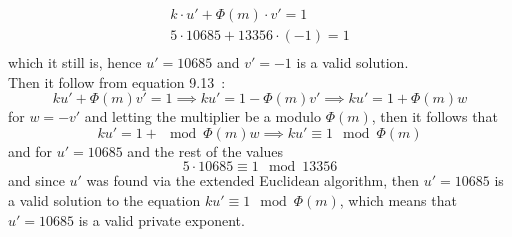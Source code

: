 \documentclass[12pt]{article}
\begin{document}
\begin{align*}
    k \cdot u' + \Phi(m) \cdot v' = 1\\
    5 \cdot 10685 + 13356 \cdot (-1) = 1\\
\end{align*}
which it still is, hence $u' = 10685$ and $v' = -1$ is a valid solution.\\
Then it follow from equation 9.13~\cite{Algebra}:
\begin{equation*}
    ku' + \Phi(m)v' = 1 \implies ku' = 1 - \Phi(m)v' \implies ku' = 1 + \Phi(m)w
\end{equation*}
for $w=-v'$ and letting the multiplier be a modulo $\Phi(m)$, then it follows that
\begin{equation*}
    ku' = 1 + \mod \Phi(m)w \implies ku' \equiv 1 \mod \Phi(m)
\end{equation*}
and for $u' = 10685$ and the rest of the values
\begin{equation*}
    5 \cdot 10685 \equiv 1 \mod 13356
\end{equation*}
and since $u'$ was found via the extended Euclidean algorithm, then $u' = 10685$ is a valid solution to the equation $ku' \equiv 1 \mod \Phi(m)$, which means that $u' = 10685$ is a valid private exponent.\\
\printbibliography
\end{document}
